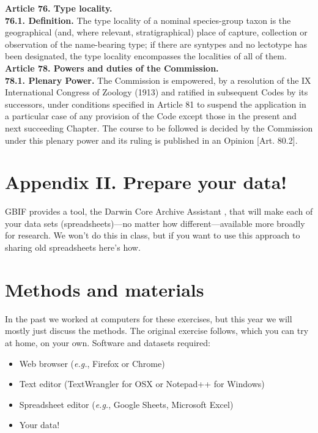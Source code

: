\documentclass[letterpaper, 11pt]{article}
\begin{document}
\noindent{}\textbf{Article 76. Type locality.}\\
\noindent{}\textbf{76.1. Definition.} The type locality of a nominal species-group taxon is the geographical (and, where relevant, stratigraphical) place of capture, collection or observation of the name-bearing type; if there are syntypes and no lectotype has been designated, the type locality encompasses the localities of all of them.\\

\noindent{}\textbf{Article 78. Powers and duties of the Commission.}\\
\noindent{}\textbf{78.1. Plenary Power.} The Commission is empowered, by a resolution of the IX International Congress of Zoology (1913) and ratified in subsequent Codes by its successors, under conditions specified in Article 81 to suspend the application in a particular case of any provision of the Code except those in the present and next succeeding Chapter. The course to be followed is decided by the Commission under this plenary power and its ruling is published in an Opinion [Art. 80.2].



\clearpage


\section*{Appendix II. Prepare your data!}

GBIF provides a tool, the Darwin Core Archive Assistant \citep{DWCaGuide}, that will make each of your data sets (spreadsheets)---no matter how different---available more broadly for research. We won't do this in class, but if you want to use this approach to sharing old spreadsheets here's how.

\section*{Methods and materials}
In the past we worked at computers for these exercises, but this year we will mostly just discuss the methods. The original exercise follows, which you can try at home, on your own. Software and datasets required:
\begin{itemize}
\item Web browser (\textit{e.g.}, Firefox or Chrome)
\item Text editor (TextWrangler for OSX or Notepad++ for Windows)
\item Spreadsheet editor (\textit{e.g.}, Google Sheets, Microsoft Excel)
\item Your data!
\end{itemize}
\end{document}
